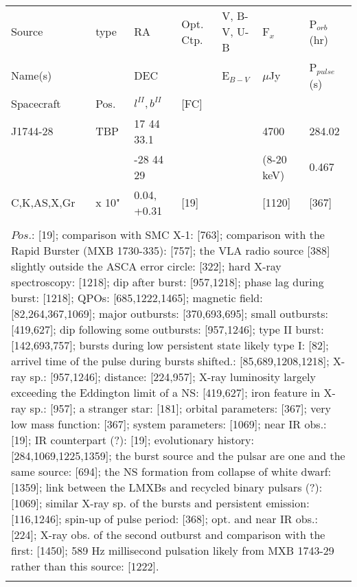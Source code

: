 \documentclass{aa}
\begin{document}
\begin{tabular}{p{2.5cm}p{1cm}p{1.8cm}p{2.3cm}p{3.3cm}p{2.0cm}p{2.2cm}}
\noalign{\smallskip}
\multicolumn{7}{p{17.5cm}}{Table 1.  (continued) }\\        
\hline
\noalign{\smallskip}
Source         & type  & RA                       &  Opt. Ctp. & V, B-V, U-B  & F$_{x}$          & P$_{orb}$(hr)    \\
Name(s)       &            & DEC                    &                     & E$_{B-V}$   & $\mu$Jy        & P$_{pulse}$(s) \\
Spacecraft & Pos.  & $l^{II}, b^{II}$      &  [FC]           &                        &                         &                             \\
\noalign{\smallskip} 
\hline

\noalign{\smallskip}
J1744-28            & TBP    & 17 44 33.1   &                    &                    & 4700              & 284.02    \\
                             &             & -28 44 29     &                    &                    & (8-20 keV)     & 0.467   \\
C,K,AS,X,Gr      & x 10"   & 0.04, +0.31   & [19]             &                    & [1120]            & [367]   \\
\\
\multicolumn{7}{p{17.5cm}}{
$Pos$.: [19]; comparison with SMC X-1: [763]; comparison with the Rapid Burster 
(MXB 1730-335): [757]; the VLA radio source [388] slightly outside the ASCA error circle: [322]; hard X-ray 
spectroscopy: [1218]; dip after burst: [957,1218]; phase lag during burst: [1218]; QPOs: [685,1222,1465]; 
magnetic field: [82,264,367,1069]; major outbursts: [370,693,695]; small 
outbursts: [419,627]; dip following some outbursts: [957,1246]; type II burst: [142,693,757]; bursts during 
low persistent state likely type I: [82]; arrivel time of the pulse during bursts shifted.: [85,689,1208,1218]; 
X-ray sp.: [957,1246]; distance: [224,957]; X-ray luminosity largely exceeding the Eddington limit of a NS: 
[419,627]; iron feature in X-ray sp.: [957]; a stranger star: [181]; orbital parameters: [367]; very low mass 
function: [367]; system parameters: [1069]; near IR obs.: [19]; IR counterpart (?): [19]; evolutionary history: 
[284,1069,1225,1359]; the burst source and the pulsar are one and the same source: [694]; the NS formation 
from collapse of white dwarf: [1359]; link between the LMXBs and recycled binary pulsars (?): [1069]; similar 
X-ray sp. of the bursts and persistent emission: [116,1246]; spin-up of pulse period: [368]; opt. and near IR 
obs.: [224]; X-ray obs. of the second outburst and comparison with the first: [1450]; 
589 Hz millisecond pulsation likely from MXB 1743-29 rather than this source: [1222].}\\
\noalign{\smallskip}
\hline


\end{tabular}
\end{document}
